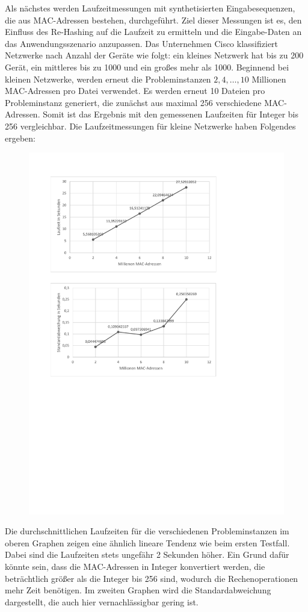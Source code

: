 Als nächstes werden Laufzeitmessungen mit synthetisierten Eingabesequenzen, die aus MAC-Adressen bestehen, durchgeführt. Ziel dieser Messungen ist es, den Einfluss des Re-Hashing auf die Laufzeit zu ermitteln und die Eingabe-Daten an das Anwendungsszenario anzupassen. Das Unternehmen Cisco klassifiziert Netzwerke nach Anzahl der Geräte wie folgt: ein kleines Netzwerk hat bis zu 200 Gerät, ein mittleres bis zu 1000 und ein großes mehr als 1000. Beginnend bei kleinen Netzwerke, werden erneut die Probleminstanzen \(2, 4, \dots{}, 10\) Millionen MAC-Adressen pro Datei verwendet. Es werden erneut 10 Dateien pro Probleminstanz generiert, die zunächst aus maximal 256 verschiedene MAC-Adressen. Somit ist das Ergebnis mit den gemessenen Laufzeiten für Integer bis 256 vergleichbar. Die Laufzeitmessungen für kleine Netzwerke haben Folgendes ergeben:
\newpage
\begin{figure}[H]
	\hspace*{-1.7cm}\includegraphics[width=1.5\linewidth]{Bilder/benchmark_network_small.pdf}
\end{figure}
\newpage
Die durchschnittlichen Laufzeiten für die verschiedenen Probleminstanzen im oberen Graphen zeigen eine ähnlich lineare Tendenz wie beim ersten Testfall. Dabei sind die Laufzeiten stets ungefähr 2 Sekunden höher. Ein Grund dafür könnte sein, dass die MAC-Adressen in Integer konvertiert werden, die beträchtlich größer als die Integer bis 256 sind, wodurch die Rechenoperationen mehr Zeit benötigen. Im zweiten Graphen wird die Standardabweichung dargestellt, die auch hier vernachlässigbar gering ist.

